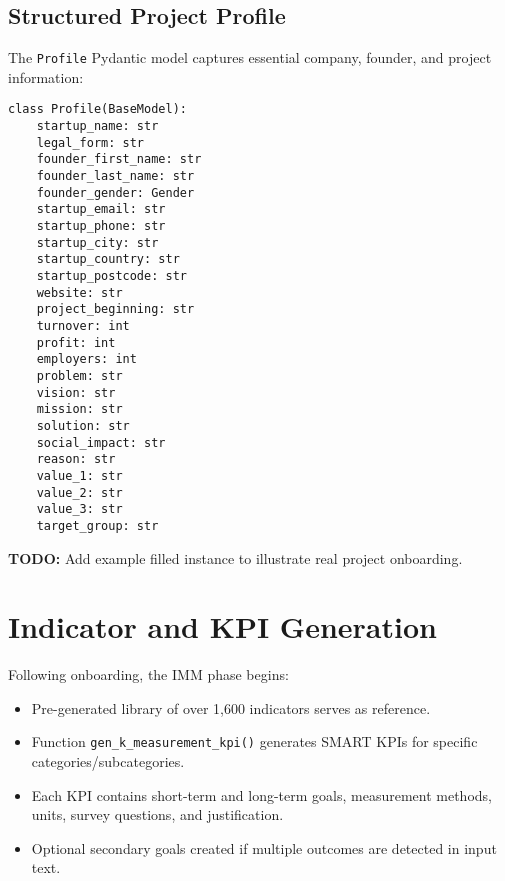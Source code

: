 \subsection{Structured Project Profile}\label{subsec:profile-model}

The \texttt{Profile} Pydantic model captures essential company, founder, and project information:

\begin{verbatim}
class Profile(BaseModel):
    startup_name: str
    legal_form: str
    founder_first_name: str
    founder_last_name: str
    founder_gender: Gender
    startup_email: str
    startup_phone: str
    startup_city: str
    startup_country: str
    startup_postcode: str
    website: str
    project_beginning: str
    turnover: int
    profit: int
    employers: int
    problem: str
    vision: str
    mission: str
    solution: str
    social_impact: str
    reason: str
    value_1: str
    value_2: str
    value_3: str
    target_group: str
\end{verbatim}

\textbf{TODO:} Add example filled instance to illustrate real project onboarding.

\section{Indicator and KPI Generation}\label{sec:kpi-generation}

Following onboarding, the IMM phase begins:

\begin{itemize}
    \item Pre-generated library of over 1,600 indicators serves as reference.
    \item Function \texttt{gen\_k\_measurement\_kpi()} generates SMART KPIs for specific categories/subcategories.
    \item Each KPI contains short-term and long-term goals, measurement methods, units, survey questions, and justification.
    \item Optional secondary goals created if multiple outcomes are detected in input text.
\end{itemize}

